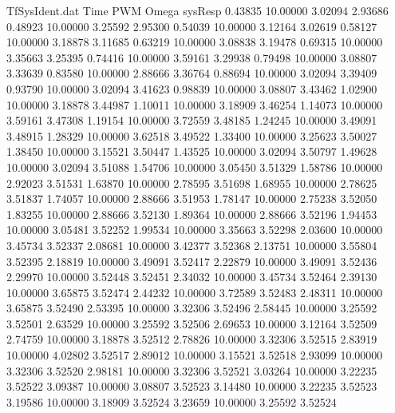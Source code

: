 \begin{filecontents}{TfSysIdent.dat}
Time PWM Omega sysResp
   0.43835   10.00000    3.02094    2.93686
   0.48923   10.00000    3.25592    2.95300
   0.54039   10.00000    3.12164    3.02619
   0.58127   10.00000    3.18878    3.11685
   0.63219   10.00000    3.08838    3.19478
   0.69315   10.00000    3.35663    3.25395
   0.74416   10.00000    3.59161    3.29938
   0.79498   10.00000    3.08807    3.33639
   0.83580   10.00000    2.88666    3.36764
   0.88694   10.00000    3.02094    3.39409
   0.93790   10.00000    3.02094    3.41623
   0.98839   10.00000    3.08807    3.43462
   1.02900   10.00000    3.18878    3.44987
   1.10011   10.00000    3.18909    3.46254
   1.14073   10.00000    3.59161    3.47308
   1.19154   10.00000    3.72559    3.48185
   1.24245   10.00000    3.49091    3.48915
   1.28329   10.00000    3.62518    3.49522
   1.33400   10.00000    3.25623    3.50027
   1.38450   10.00000    3.15521    3.50447
   1.43525   10.00000    3.02094    3.50797
   1.49628   10.00000    3.02094    3.51088
   1.54706   10.00000    3.05450    3.51329
   1.58786   10.00000    2.92023    3.51531
   1.63870   10.00000    2.78595    3.51698
   1.68955   10.00000    2.78625    3.51837
   1.74057   10.00000    2.88666    3.51953
   1.78147   10.00000    2.75238    3.52050
   1.83255   10.00000    2.88666    3.52130
   1.89364   10.00000    2.88666    3.52196
   1.94453   10.00000    3.05481    3.52252
   1.99534   10.00000    3.35663    3.52298
   2.03600   10.00000    3.45734    3.52337
   2.08681   10.00000    3.42377    3.52368
   2.13751   10.00000    3.55804    3.52395
   2.18819   10.00000    3.49091    3.52417
   2.22879   10.00000    3.49091    3.52436
   2.29970   10.00000    3.52448    3.52451
   2.34032   10.00000    3.45734    3.52464
   2.39130   10.00000    3.65875    3.52474
   2.44232   10.00000    3.72589    3.52483
   2.48311   10.00000    3.65875    3.52490
   2.53395   10.00000    3.32306    3.52496
   2.58445   10.00000    3.25592    3.52501
   2.63529   10.00000    3.25592    3.52506
   2.69653   10.00000    3.12164    3.52509
   2.74759   10.00000    3.18878    3.52512
   2.78826   10.00000    3.32306    3.52515
   2.83919   10.00000    4.02802    3.52517
   2.89012   10.00000    3.15521    3.52518
   2.93099   10.00000    3.32306    3.52520
   2.98181   10.00000    3.32306    3.52521
   3.03264   10.00000    3.22235    3.52522
   3.09387   10.00000    3.08807    3.52523
   3.14480   10.00000    3.22235    3.52523
   3.19586   10.00000    3.18909    3.52524
   3.23659   10.00000    3.25592    3.52524

\end{filecontents}
